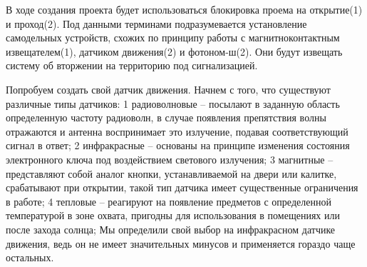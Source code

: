 В ходе создания проекта будет использоваться блокировка проема на открытие(1) и проход(2). Под данными терминами подразумевается установление 
самодельных устройств, схожих по принципу работы с магнитноконтактным извещателем(1), датчиком движения(2) и фотоном-ш(2). Они будут извещать 
систему об вторжении на территорию под сигнализацией. 

Попробуем создать свой датчик движения. Начнем с того, что существуют различные типы датчиков:
1 радиоволновые – посылают в заданную область определенную частоту радиоволн, в случае появления препятствия волны отражаются и антенна воспринимает 
это излучение, подавая соответствующий сигнал в ответ;
2 инфракрасные – основаны на принципе изменения состояния электронного ключа под воздействием светового излучения;
3 магнитные – представляют собой аналог кнопки, устанавливаемой на двери или калитке, срабатывают при открытии, такой тип датчика имеет существенные 
ограничения в работе;
4 тепловые – реагируют на появление предметов с определенной температурой в зоне охвата, пригодны для использования в помещениях или после захода солнца;
Мы определили свой выбор на инфракрасном датчике движения, ведь он не имеет значительных минусов и применяется гораздо чаще остальных.
